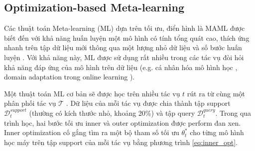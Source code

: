 \documentclass[aps,prb,groupedaddress,twocolumn,showpacs,dvipdfmx,superscriptaddress,pdftex]{revtex4-2}
\begin{document}

\subsection{Optimization-based Meta-learning}

Các thuật toán Meta-learning (ML) dựa trên tối ưu, điển hình là MAML \cite{finn2017model} được biết đến với khả năng huấn luyện một mô hình có tính tổng quát cao, thích ứng nhanh trên tập dữ liệu mới thông qua một lượng nhỏ dữ liệu và số bước huấn luyện \citep{hospedales2021meta, vettoruzzo2024advances}. Với khả năng này, ML được sử dụng rất nhiều trong các tác vụ đòi hỏi khả năng đáp ứng của mô hình trên dữ liệu (e.g. cá nhân hóa mô hình học \citep{chen2018federated, fallah2020personalized,nguyen2022meta}, domain adaptation trong online learning \citep{hu2023meta, khoee2024domain}).


\vspace{2mm}

Một thuật toán ML cơ bản sẽ được học trên nhiều tác vụ $t$ rút ra từ cùng một phân phối tác vụ $\mathcal{T}$ \cite{hospedales2021meta}. Dữ liệu của mỗi tác vụ được chia thành tập support $\mathcal{D}_t^{support}$ (thường có kích thước nhỏ, khoảng 20\%) và tập query $\mathcal{D}_t^{query}$. Trong qua trình học, hai bước tối ưu inner và outer optimization được perform đan xen. Inner optimization cố gắng tìm ra một bộ tham số tối ưu $\theta_t^*$ cho từng mô hình học máy trên tập support của mỗi tác vụ bằng phương trình \ref{eq:inner_opt}.
\end{document}
